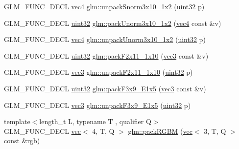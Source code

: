 \begin{DoxyCompactItemize}
\item 
G\+L\+M\+\_\+\+F\+U\+N\+C\+\_\+\+D\+E\+CL \hyperlink{group__core__types_ga5881b1b022d7fd1b7218f5916532dd02}{vec4} \hyperlink{group__gtc__packing_ga8b8bb827a3743ca553d8702d3e337101}{glm\+::unpack\+Snorm3x10\+\_\+1x2} (\hyperlink{group__gtc__type__precision_ga202b6a53c105fcb7e531f9b443518451}{uint32} p)
\item 
G\+L\+M\+\_\+\+F\+U\+N\+C\+\_\+\+D\+E\+CL \hyperlink{group__gtc__type__precision_ga202b6a53c105fcb7e531f9b443518451}{uint32} \hyperlink{group__gtc__packing_ga2cf2d11b40bd48639110456fd74c2e33}{glm\+::pack\+Unorm3x10\+\_\+1x2} (\hyperlink{group__core__types_ga5881b1b022d7fd1b7218f5916532dd02}{vec4} const \&v)
\item 
G\+L\+M\+\_\+\+F\+U\+N\+C\+\_\+\+D\+E\+CL \hyperlink{group__core__types_ga5881b1b022d7fd1b7218f5916532dd02}{vec4} \hyperlink{group__gtc__packing_gaf69ace2b5e9234f8afb4e99c3df1193d}{glm\+::unpack\+Unorm3x10\+\_\+1x2} (\hyperlink{group__gtc__type__precision_ga202b6a53c105fcb7e531f9b443518451}{uint32} p)
\item 
G\+L\+M\+\_\+\+F\+U\+N\+C\+\_\+\+D\+E\+CL \hyperlink{group__gtc__type__precision_ga202b6a53c105fcb7e531f9b443518451}{uint32} \hyperlink{group__gtc__packing_ga8c2a0eeee677ca4dafd9e093d9e81062}{glm\+::pack\+F2x11\+\_\+1x10} (\hyperlink{group__core__types_ga1c47e8b3386109bc992b6c48e91b0be7}{vec3} const \&v)
\item 
G\+L\+M\+\_\+\+F\+U\+N\+C\+\_\+\+D\+E\+CL \hyperlink{group__core__types_ga1c47e8b3386109bc992b6c48e91b0be7}{vec3} \hyperlink{group__gtc__packing_ga8b9c7991eb021d95c778bf5c0b2f7824}{glm\+::unpack\+F2x11\+\_\+1x10} (\hyperlink{group__gtc__type__precision_ga202b6a53c105fcb7e531f9b443518451}{uint32} p)
\item 
G\+L\+M\+\_\+\+F\+U\+N\+C\+\_\+\+D\+E\+CL \hyperlink{group__gtc__type__precision_ga202b6a53c105fcb7e531f9b443518451}{uint32} \hyperlink{group__gtc__packing_ga0984f9598edc648d59a9643d9a61b121}{glm\+::pack\+F3x9\+\_\+\+E1x5} (\hyperlink{group__core__types_ga1c47e8b3386109bc992b6c48e91b0be7}{vec3} const \&v)
\item 
G\+L\+M\+\_\+\+F\+U\+N\+C\+\_\+\+D\+E\+CL \hyperlink{group__core__types_ga1c47e8b3386109bc992b6c48e91b0be7}{vec3} \hyperlink{group__gtc__packing_ga15d8845a31e1e55d493803d0c8cb5910}{glm\+::unpack\+F3x9\+\_\+\+E1x5} (\hyperlink{group__gtc__type__precision_ga202b6a53c105fcb7e531f9b443518451}{uint32} p)
\item 
{\footnotesize template$<$length\+\_\+t L, typename T , qualifier Q$>$ }\\G\+L\+M\+\_\+\+F\+U\+N\+C\+\_\+\+D\+E\+CL \hyperlink{structglm_1_1vec}{vec}$<$ 4, T, Q $>$ \hyperlink{group__gtc__packing_ga0466daf4c90f76cc64b3f105ce727295}{glm\+::pack\+R\+G\+BM} (\hyperlink{structglm_1_1vec}{vec}$<$ 3, T, Q $>$ const \&rgb)

\end{DoxyCompactItemize}
